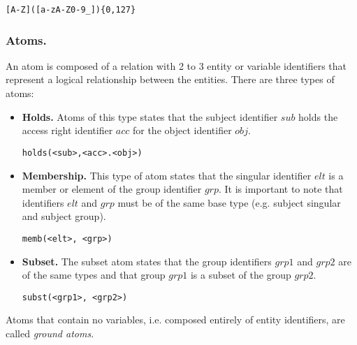 \documentclass[11pt]{llncs}
\begin{document}
        \begin{verbatim}[A-Z]([a-zA-Z0-9_]){0,127}\end{verbatim}

      \subsubsection{Atoms.}

        An atom is composed of a relation with 2 to 3 entity or variable
        identifiers that represent a logical relationship between the entities.
        There are three types of atoms:

        \begin{itemize}
          \item
            {\bf Holds.} Atoms of this type states that the subject
            identifier $sub$ holds the access right identifier $acc$ for the
            object identifier $obj$.

            \begin{verbatim}holds(<sub>,<acc>.<obj>)\end{verbatim}

          \vspace{1mm}
          \item
            {\bf Membership.} This type of atom states that the singular
            identifier $elt$ is a member or element of the group identifier
            $grp$. It is important to note that identifiers $elt$ and $grp$
            must be of the same base type (e.g. subject singular and subject
            group).

            \begin{verbatim}memb(<elt>, <grp>)\end{verbatim}

          \vspace{1mm}
          \item
            {\bf Subset.} The subset atom states that the group identifiers
            $grp1$ and $grp2$ are of the same types and that group $grp1$ is
            a subset of the group $grp2$.

            \begin{verbatim}subst(<grp1>, <grp2>)\end{verbatim}
        \end{itemize}

        Atoms that contain no variables, i.e. composed entirely of entity
        identifiers, are called {\em ground atoms}.
\end{document}
